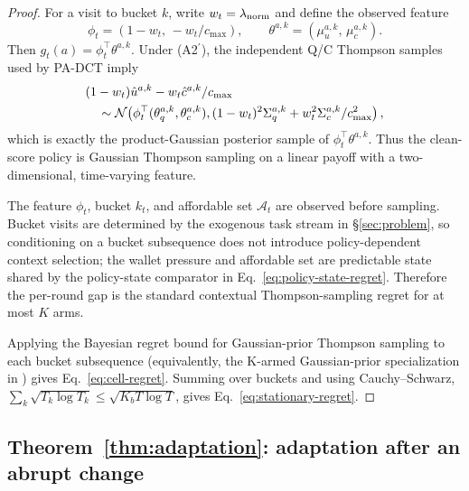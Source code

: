 \begin{proof}
For a visit to bucket $k$, write $w_t=\lambda_{\mathrm{norm}}$ and define the observed feature
\[
\phi_t=(1-w_t,\,-w_t/c_{\max}),\qquad
\theta^{a,k}=(\mu_u^{a,k},\,\mu_c^{a,k}).
\]
Then $g_t(a)=\phi_t^\top\theta^{a,k}$. Under (A2$^\prime$), the independent
Q/C Thompson samples used by PA-DCT imply
\[
\begin{aligned}
&(1-w_t)\hat u^{a,k}-w_t\hat c^{a,k}/c_{\max}\\
&\quad\sim
\mathcal{N}\!\left(
\phi_t^\top(\theta_q^{a,k},\theta_c^{a,k}),
(1-w_t)^2\Sigma_q^{a,k}
+w_t^2\Sigma_c^{a,k}/c_{\max}^2
\right),
\end{aligned}
\]
which is exactly the product-Gaussian posterior sample of
$\phi_t^\top\theta^{a,k}$. Thus the clean-score policy is Gaussian Thompson
sampling on a linear payoff with a two-dimensional, time-varying feature.

The feature $\phi_t$, bucket $k_t$, and affordable set $\mathcal{A}_t$ are
observed before sampling. Bucket visits are determined by the exogenous task
stream in \S\ref{sec:problem}, so conditioning on a bucket subsequence does not
introduce policy-dependent context selection; the wallet pressure and affordable
set are predictable state shared by the policy-state comparator in
Eq.~\eqref{eq:policy-state-regret}. Therefore the per-round gap is the standard
contextual Thompson-sampling regret for at most $K$ arms.

Applying the Bayesian regret bound for Gaussian-prior Thompson sampling
\citep[Theorem~1]{russo2014learning} to each bucket subsequence (equivalently,
the K-armed Gaussian-prior specialization in \citep[Ch.~36]{lattimore2020bandit})
gives Eq.~\eqref{eq:cell-regret}. Summing over buckets and using Cauchy--Schwarz,
$\sum_k\sqrt{T_k\log T_k}\leq\sqrt{K_bT\log T}$, gives
Eq.~\eqref{eq:stationary-regret}.
\end{proof}

\subsection{Theorem~\ref{thm:adaptation}: adaptation after an abrupt change}
\label{app:proof-adaptation}

